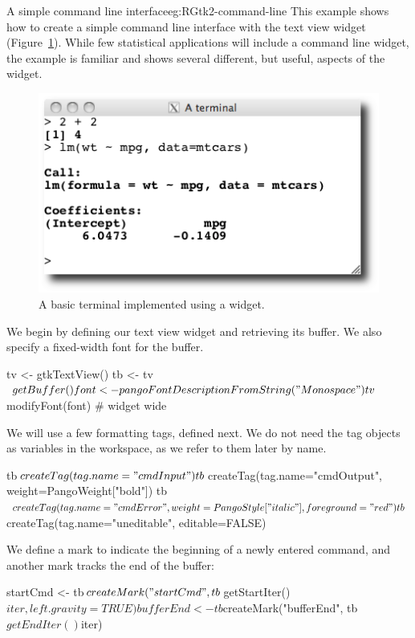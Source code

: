 \begin{example}{A simple command line interface}{eg:RGtk2-command-line}
This example shows how to create a simple command line interface with
the text view widget (Figure~\ref{fig:RGtk2-terminal}). While few statistical applications will include
a command line widget, the example is familiar and shows several
different, but useful, aspects of the widget.

\begin{figure}
  \centering
  \includegraphics[width=.6\textwidth]{ex-RGtk2-terminal}
  \caption{A basic \R\/ terminal implemented using a  widget.}
  \label{fig:RGtk2-terminal}
\end{figure}


We begin by defining our text view widget and retrieving its
buffer. We also specify a fixed-width font for the buffer.
\begin{Schunk}
\begin{Sinput}
 tv <- gtkTextView()
 tb <- tv$getBuffer()
 font <- pangoFontDescriptionFromString("Monospace")
 tv$modifyFont(font)                     # widget wide
\end{Sinput}
\end{Schunk}

We will use a few formatting tags, defined next. We do not need the
tag objects as variables in the workspace, as we refer to them later
by name.
\begin{Schunk}
\begin{Sinput}
 tb$createTag(tag.name="cmdInput")
 tb$createTag(tag.name="cmdOutput", 
              weight=PangoWeight["bold"])
 tb$createTag(tag.name="cmdError", 
              weight=PangoStyle["italic"], foreground="red")
 tb$createTag(tag.name="uneditable", editable=FALSE)
\end{Sinput}
\end{Schunk}

We define a mark to indicate the beginning of a newly entered
command, and another mark tracks the end of the buffer:
\begin{Schunk}
\begin{Sinput}
 startCmd <- tb$createMark("startCmd", tb$getStartIter()$iter, 
                           left.gravity=TRUE)
 bufferEnd <- tb$createMark("bufferEnd", tb$getEndIter()$iter)
\end{Sinput}
\end{Schunk}



\end{example}
